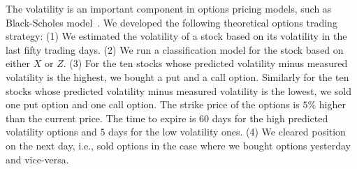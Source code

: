 \documentclass[10pt,twocolumn,letterpaper]{article}
\begin{document}

The volatility is an important component in options pricing models, such as Black-Scholes model~\cite{BS}. We developed the following theoretical options trading strategy: 
(1) We estimated the volatility of a stock based on its volatility in the last fifty trading days. 
(2) We run a classification model for the stock based on either $X$ or $Z$. 
(3) For the ten stocks whose predicted volatility minus measured volatility is the highest, we bought a put and a call option. Similarly for the ten stocks whose predicted volatility minus measured volatility is the lowest, we sold one put option and one call option. The strike price of the options is $5\%$ higher than the current price. The time to expire is $60$ days for the high predicted volatility options and $5$ days for the low volatility ones. 
(4) We cleared position on the next day, i.e., sold options in the case where we bought options yesterday and vice-versa.
\end{document}
